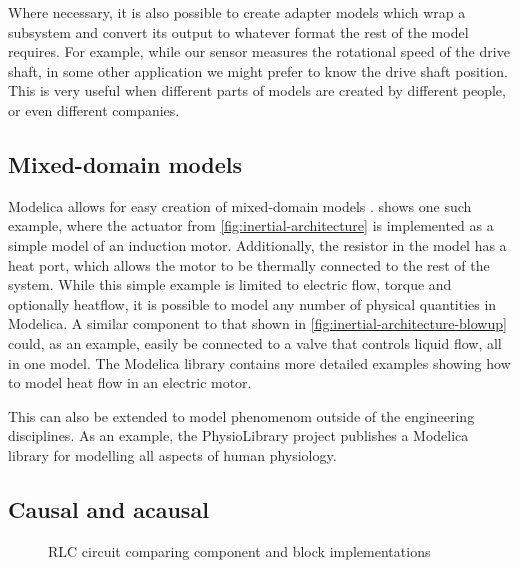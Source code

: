 \documentclass[\rootfolder/main.tex]{subfiles}
\begin{document}
Where necessary, it is also possible to create adapter models which wrap a subsystem and convert its output to whatever format the rest of the model requires.
For example, while our sensor measures the rotational speed of the drive shaft, in some other application we might prefer to know the drive shaft position.
This is very useful when different parts of models are created by different people, or even different companies.

\subsection{Mixed-domain models}

Modelica allows for easy creation of mixed-domain models \cite{clauss2002}.
 shows one such example, where the actuator from \cref{fig:inertial-architecture} is implemented as a simple model of an induction motor.
Additionally, the resistor in the model has a heat port, which allows the motor to be thermally connected to the rest of the system.
While this simple example is limited to electric flow, torque and optionally heatflow, it is possible to model any number of physical quantities in Modelica.
A similar component to that shown in \cref{fig:inertial-architecture-blowup} could, as an example, easily be connected to a valve that controls liquid flow, all in one model.
The Modelica library contains more detailed examples showing how to model heat flow in an electric motor\footnotemark.

This can also be extended to model phenomenom outside of the engineering disciplines.
As an example, the PhysioLibrary project publishes a Modelica library for modelling all aspects of human physiology.


\subsection{Causal and acausal}

\begin{figure}[ht]
    \centering
        {
        }
        {
        }
    \caption{RLC circuit comparing component and block implementations}
    \label{fig:rlc}
\end{figure}
\end{document}
